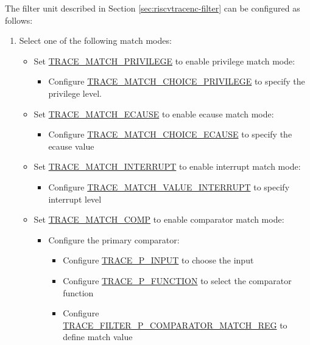 \documentclass[main\_\_EN.tex]{subfiles}
\begin{document}
The filter unit described in Section \ref{sec:riscvtracenc-filter} can be configured as follows:


\begin{enumerate}
    \item Select one of the following match modes:
        \begin{itemize}
            \item Set \hyperref[fielddesc:TRACEMATCHPRIVILEGE]{TRACE\_MATCH\_PRIVILEGE} to enable privilege match mode:
                \begin{itemize}
                    \item Configure \hyperref[fielddesc:TRACEMATCHCHOICEPRIVILEGE]{TRACE\_MATCH\_CHOICE\_PRIVILEGE} to specify the privilege level.
                \end{itemize}
            \item Set \hyperref[fielddesc:TRACEMATCHECAUSE]{TRACE\_MATCH\_ECAUSE} to enable ecause match mode:
                \begin{itemize}
                    \item Configure \hyperref[fielddesc:TRACEMATCHCHOICEECAUSE]{TRACE\_MATCH\_CHOICE\_ECAUSE} to specify the ecause value
                \end{itemize}
            \item Set \hyperref[fielddesc:TRACEMATCHINTERRUPT]{TRACE\_MATCH\_INTERRUPT} to enable interrupt match mode:
                \begin{itemize}
                    \item Configure \hyperref[fielddesc:TRACEMATCHVALUEINTERRUPT]{TRACE\_MATCH\_VALUE\_INTERRUPT} to specify interrupt level
                \end{itemize}
            \item Set \hyperref[fielddesc:TRACEMATCHCOMP]{TRACE\_MATCH\_COMP} to enable comparator match mode:
                \begin{itemize}
                    \item Configure the primary comparator:
                        \begin{itemize}
                            \item Configure \hyperref[fielddesc:TRACEPINPUT]{TRACE\_P\_INPUT} to choose the input
                            \item Configure \hyperref[fielddesc:TRACEPFUNCTION]{TRACE\_P\_FUNCTION} to select the comparator function
                            \item Configure \hyperref[regdesc:TRACEFILTERPCOMPARATORMATCHREG]{TRACE\_FILTER\_P\_COMPARATOR\_MATCH\_REG} to define match value

\end{itemize}
\end{itemize}
\end{itemize}
\end{enumerate}
\end{document}
